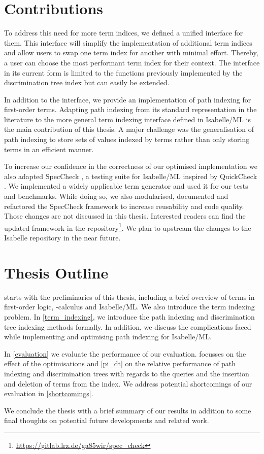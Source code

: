 \section{Contributions}
To address this need for more term indices, we defined a unified interface for them. This interface will simplify the implementation of additional term indices and allow users to swap one term index for another with minimal effort. Thereby, a user can choose the most performant term index for their context.
The interface in its current form is limited to the functions previously implemented by the discrimination tree index but can easily be extended.

In addition to the interface, we provide an implementation of path indexing for first-order terms. Adapting path indexing from its standard representation in the literature to the more general term indexing interface defined in Isabelle/ML is the main contribution of this thesis.
A major challenge was the generalisation of path indexing to store sets of values indexed by terms rather than only storing terms in an efficient manner.

To increase our confidence in the correctness of our optimised implementation we also adapted SpecCheck \cite{bulwahn_new_2012}, a testing suite for Isabelle/ML inspired by QuickCheck \cite{claessen_quickcheck_2011}.
We implemented a widely applicable term generator and used it for our tests and benchmarks.
While doing so, we also modularised, documented and refactored the SpecCheck framework to increase reusability and code quality.
Those changes are not discussed in this thesis.
Interested readers can find the updated framework in the repository\footnote{\url{https://gitlab.lrz.de/ga85wir/spec_check}}.
We plan to upstream the changes to the Isabelle repository in the near future.

\section{Thesis Outline}
 starts with the preliminaries of this thesis, including a brief overview of terms in first-order logic, \lam -calculus and Isabelle/ML. We also introduce the term indexing problem. In \cref{term_indexing}, we introduce the path indexing and discrimination tree indexing methods formally. In addition, we discuss the complications faced while implementing and optimising path indexing for Isabelle/ML.

In \cref{evaluation} we evaluate the performance of our evaluation.  focusses on the effect of the optimisations and \cref{pi_dt} on the relative performance of path indexing and discrimination trees with regards to the queries and the insertion and deletion of terms from the index. We address potential shortcomings of our evaluation in \cref{shortcomings}.

We conclude the thesis with a brief summary of our results in addition to some final thoughts on potential future developments and related work.
